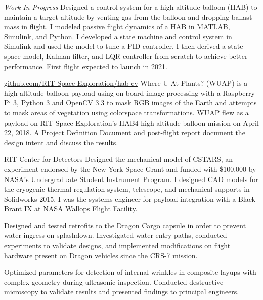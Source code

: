 \documentclass[10pt,final,sans]{resume}
\begin{document}
{\it Work In Progress}
Designed a control system for a high altitude balloon (HAB) to maintain a
target altitude by venting gas from the balloon and dropping ballast mass in
flight. I modeled passive flight dynamics of a HAB in MATLAB, Simulink, and
Python. I developed a state machine and control system in Simulink and used the
model to tune a PID controller. I then derived a state-space model, Kalman
filter, and LQR controller from scratch to achieve better performance. First
flight expected to launch in 2021.

{\href{https://github.com/RIT-Space-Exploration/hab-cv/}{github.com/RIT-Space-Exploration/hab-cv}}{}
Where U At Plants? (WUAP) is a high-altitude balloon payload using on-board
image processing with a Raspberry Pi 3, Python 3 and OpenCV 3.3 to mask RGB
images of the Earth and attempts to mask areas of vegetation using colorspace
transformations. WUAP flew as a payload on RIT Space Exploration's HAB4 high
altitude balloon mission on April 22, 2018. A
\href{https://github.com/RIT-Space-Exploration/hab-cv/blob/master/reports/Project%20Definition%20Document/hab-cv.pdf}{Project
Definition Document} and
\href{https://github.com/RIT-Space-Exploration/hab-cv/blob/master/reports/HAB4%20Post%20Flight%20Report/report_wuap_postflight-hab4.md}{post-flight
report} document the design intent and discuss the results.

{RIT Center for Detectors}{}
Designed the mechanical model of CSTARS, an experiment endorsed by the New York
Space Grant and funded with \$100,000 by NASA's Undergraduate Student Instrument
Program. I designed CAD models for the cryogenic thermal regulation system,
telescope, and mechanical supports in Solidworks 2015. I was the systems
engineer for payload integration with a Black Brant IX at NASA Wallops Flight
Facility.

Designed and tested retrofits to the Dragon Cargo capsule in order to prevent
water ingress on splashdown. Investigated water entry paths, conducted
experiments to validate designs, and implemented modifications on flight
hardware present on Dragon vehicles since the CRS-7 mission.

Optimized parameters for detection of internal wrinkles in composite layups
with complex geometry during ultrasonic inspection. Conducted destructive
microscopy to validate results and presented findings to principal engineers.
\end{document}
